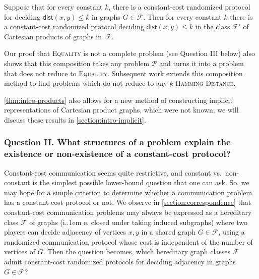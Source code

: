\documentclass{theoretics}
\makeatletter
\newcommand{\dist}{\mathsf{dist}}
\newcommand{\cF}{\ensuremath{\mathcal{F}}}
\newcommand{\cP}{\ensuremath{\mathcal{P}}}
\newcommand*\ie{i.\kern.1em e.\@\xspace} %
\makeatother
\begin{document}
\begin{theorem}
\label{thm:intro-products}
Suppose that for every constant $k$, there is a constant-cost randomized protocol for deciding
$\dist(x,y) \leq k$ in graphs $G \in \cF$. Then for every constant $k$ there is a constant-cost
randomized protocol deciding $\dist(x,y) \leq k$ in the class $\cF^\square$ of Cartesian products of graphs in~$\cF$.
\end{theorem}

Our proof that \textsc{Equality} is not a complete problem (see Question III below) also shows that
this composition takes any problem $\cP$ and turns it into a problem that does not reduce to
\textsc{Equality}. Subsequent work \cite{FGHH24} extends this composition method to find problems
which do not reduce to any \textsc{$k$-Hamming Distance}.

\cref{thm:intro-products} also allows for a new method of constructing implicit representations of Cartesian
product graphs, which were not known; we will discuss these results in
\cref{section:intro-implicit}.

\subsubsection*{Question II. What structures of a problem explain the existence or non-existence of
a constant-cost protocol?}

Constant-cost communication seems quite restrictive, and constant vs.~non-constant is the
simplest possible lower-bound question that one can ask. So, we may hope for a simple criterion to
determine whether a communication problem has a constant-cost protocol or not. We observe in
\cref{section:correspondence} that constant-cost communication problems may always be expressed as a
hereditary  class $\cF$ of graphs (\ie closed under taking induced subgraphs) where two players can
decide adjacency of vertices $x,y$ in a shared graph $G \in \cF$, using a randomized communication
protocol whose cost is independent of the number of vertices of $G$. Then the question becomes,
which hereditary graph classes $\cF$ admit constant-cost randomized protocols for deciding adjacency
in graphs $G \in \cF$? \\
\end{document}
